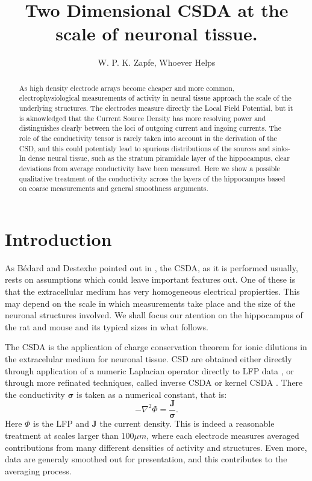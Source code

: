\documentclass{article}
\title{Two Dimensional CSDA at the scale of neuronal tissue.}
\author{W. P. K. Zapfe, Whoever Helps}
\newcommand{\Jd}{\mathbf{J}}
\newcommand{\cond}{\boldsymbol{\sigma}}
\begin{document}
\maketitle

\begin{abstract}
As high density electrode arrays become cheaper and more common, 
electrophysiological measurements of activity in neural tissue approach
the scale of the underlying structures. The electrodes measure
directly the Local Field Potential, but it is aknowledged that the
Current Source Density has more resolving power and distinguishes
clearly between the loci of outgoing current and ingoing currents.
 The role of the conductivity tensor is rarely taken into account
in the derivation of the CSD, and this could potentialy lead to
spurious distributions of the sources and sinks- 
In dense neural tissue, such as the
stratum piramidale layer of the hippocampus, clear
deviations from average conductivity have been measured. 
Here we show a possible qualitative treatment of the conductivity
across the layers of the hippocampus based on coarse measurements
and general smoothness arguments.
\end{abstract}


\section{Introduction}

As Bédard and Destexhe pointed out in \cite{Bedard11}, the CSDA, as it
is performed usually, rests on
assumptions which could leave important features out. One of these 
is that the extracellular medium has very homogeneous 
electrical propierties. This may depend on the scale in which measurements
take place and the size of the neuronal structures involved. We shall
focus our atention on the hippocampus of the rat and mouse
 and its typical sizes in what follows. 

The CSDA is the application of charge conservation theorem
for ionic dilutions in the extracelular medium for neuronal
tissue. CSD are obtained either directly through application
of a numeric Laplacian operator directly to LFP data \cite{Nicholson75}, 
or through  more refinated
techniques, called inverse CSDA \cite{Pettersen2006, Leski2011} or kernel CSDA 
\cite{Potworowsky2011}. There the conductivity $\cond$ is taken as 
 a numerical constant, that is:
\begin{equation}
-\nabla^2 \Phi = \frac{\Jd}{\cond}. 
\end{equation}
Here $\Phi$ is the LFP and $\Jd$ the current density. 
This is indeed a reasonable treatment at scales larger than $100\mu m$,
where each electrode measures averaged contributions from many different
densities of activity and structures. Even more, data are 
generaly smoothed out for presentation, and this contributes to the
averaging process.
\end{document}
